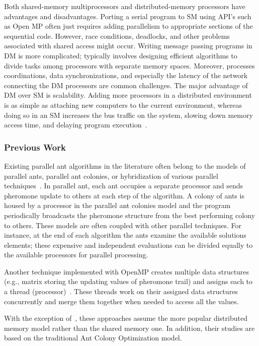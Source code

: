 \documentclass[11pt]{article}
\begin{document}
Both shared-memory multiprocessors and distributed-memory processors have advantages and disadvantages. Porting a serial program to SM using API's such as Open MP often just requires adding parallelism to appropriate sections of the sequential code.  However, race conditions, deadlocks, and other problems associated with shared access might occur.  Writing message passing programs in DM is more complicated; typically involves designing efficient algorithms to divide tasks among processors with separate memory spaces.  Moreover, processes coordinations, data synchronizations, and especially the latency of the network connecting the DM processors are common challenges.  The major advantage of DM over SM is scalability.  Adding more processors in a distributed environment is as simple as attaching new computers to the current environment, whereas doing so in an SM increases the bus traffic on the system, slowing down memory access time, and delaying program execution~\cite{}.

\subsubsection{Previous Work}

Existing parallel ant algorithms in the literature often belong to the models of parallel ants, parallel ant colonies, or hybridization of various parallel techniques~\cite{TRFR,RL}.  In parallel ant, each ant occupies a separate processor and sends pheromone update to others at each step of the algorithm. A colony of ants is housed by a processor in the parallel ant colonies model and the program periodically broadcasts the pheromone structure from the best performing colony to others.  These models are often coupled with other parallel techniques. For instance, at the end of each algorithm the ants examine the available solutions elements; these expensive and independent evaluations can be divided equally to the available processors for parallel processing.

Another technique implemented with OpenMP creates multiple data structures (e.g., matrix storing the updating values of pheromone trail) and assigns each to a thread (processor)~\cite{PKGG}.  These threads work on their assigned data structures concurrently and merge them together when needed to access all the values.

With the exception of~\cite{PKGG}, these approaches assume the more popular distributed memory model rather than the shared memory one. In addition, their studies are based on the traditional Ant Colony Optimization model.
\end{document}

